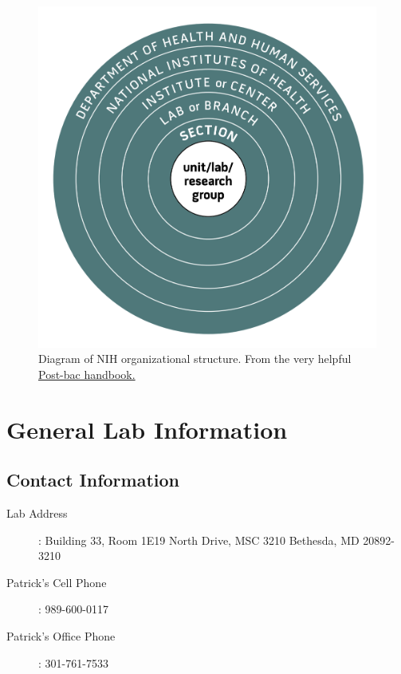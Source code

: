 \documentclass[10pt, letterpaper, twocolumn]{article} %
\begin{document}
\begin{figure}
	\includegraphics[width=\linewidth]{unitlab.png} %
	\caption{Diagram of NIH organizational structure. From the very helpful \href{https://www.training.nih.gov/documents/6/PostbacHandbook2023.pdf}{Post-bac handbook.}} %
	\label{unit_organization} %
\end{figure}

\section{General Lab Information}
\subsection{Contact Information}
\begin{description}
\item [Lab Address]: \newline Building 33, Room 1E19  North Drive, MSC 3210 \newline Bethesda, MD 20892-3210
\item [Patrick's Cell Phone]: 989-600-0117
\item [Patrick's Office Phone]: 301-761-7533
\end{description}
\end{document}
